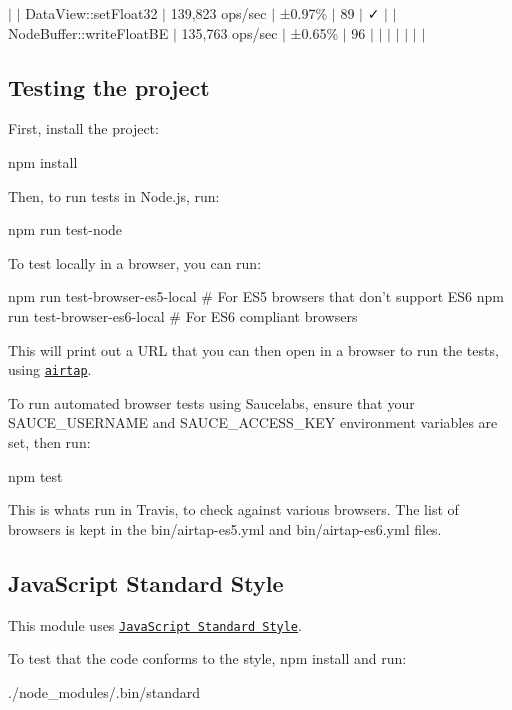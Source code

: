 $\vert$ $\vert$ Data\+View\+::set\+Float32 $\vert$ 139,823 ops/sec $\vert$ ±0.97\% $\vert$ 89 $\vert$ ✓ $\vert$ $\vert$ Node\+Buffer\+::write\+Float\+BE $\vert$ 135,763 ops/sec $\vert$ ±0.65\% $\vert$ 96 $\vert$ $\vert$ $\vert$ $\vert$ $\vert$ $\vert$ $\vert$

\subsection*{Testing the project}

First, install the project\+: \begin{DoxyVerb}npm install
\end{DoxyVerb}


Then, to run tests in Node.\+js, run\+: \begin{DoxyVerb}npm run test-node
\end{DoxyVerb}


To test locally in a browser, you can run\+: \begin{DoxyVerb}npm run test-browser-es5-local # For ES5 browsers that don't support ES6
npm run test-browser-es6-local # For ES6 compliant browsers
\end{DoxyVerb}


This will print out a U\+RL that you can then open in a browser to run the tests, using \href{https://www.npmjs.com/package/airtap}{\tt airtap}.

To run automated browser tests using Saucelabs, ensure that your {\ttfamily S\+A\+U\+C\+E\+\_\+\+U\+S\+E\+R\+N\+A\+ME} and {\ttfamily S\+A\+U\+C\+E\+\_\+\+A\+C\+C\+E\+S\+S\+\_\+\+K\+EY} environment variables are set, then run\+: \begin{DoxyVerb}npm test
\end{DoxyVerb}


This is what\textquotesingle{}s run in Travis, to check against various browsers. The list of browsers is kept in the {\ttfamily bin/airtap-\/es5.\+yml} and {\ttfamily bin/airtap-\/es6.\+yml} files.

\subsection*{Java\+Script Standard Style}

This module uses \href{https://github.com/feross/standard}{\tt Java\+Script Standard Style}.

\href{https://github.com/feross/standard}{\tt }

To test that the code conforms to the style, {\ttfamily npm install} and run\+: \begin{DoxyVerb}./node_modules/.bin/standard
\end{DoxyVerb}


